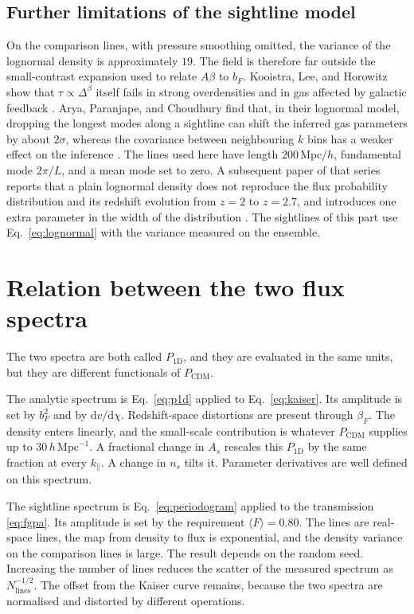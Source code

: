 \documentclass[11pt]{article}
\begin{document}
\subsection{Further limitations of the sightline model}

On the comparison lines, with pressure smoothing omitted, the variance of the lognormal density is approximately $19$.
The field is therefore far outside the small-contrast expansion used to relate $A\beta$ to $b_F$.
Kooistra, Lee, and Horowitz show that $\tau\propto\Delta^{\beta}$ itself fails in strong overdensities and in gas affected by galactic feedback \citep{Kooistra:2022hzw}.
Arya, Paranjape, and Choudhury find that, in their lognormal model, dropping the longest modes along a sightline can shift the inferred gas parameters by about $2\sigma$, whereas the covariance between neighbouring $k$ bins has a weaker effect on the inference \citep{Arya:2023ipe}.
The lines used here have length $200\,\mathrm{Mpc}/h$, fundamental mode $2\pi/L$, and a mean mode set to zero.
A subsequent paper of that series reports that a plain lognormal density does not reproduce the flux probability distribution and its redshift evolution from $z=2$ to $z=2.7$, and introduces one extra parameter in the width of the distribution \citep{Arya:2023fal}.
The sightlines of this part use Eq.~\eqref{eq:lognormal} with the variance measured on the ensemble.

\section{Relation between the two flux spectra}
\label{sec:relation}

The two spectra are both called $P_{1\mathrm{D}}$, and they are evaluated in the same units, but they are different functionals of $P_\mathrm{CDM}$.

The analytic spectrum is Eq.~\eqref{eq:p1d} applied to Eq.~\eqref{eq:kaiser}.
Its amplitude is set by $b_F^{2}$ and by $\mathrm{d}v/\mathrm{d}\chi$.
Redshift-space distortions are present through $\beta_F$.
The density enters linearly, and the small-scale contribution is whatever $P_\mathrm{CDM}$ supplies up to $30\,h\,\mathrm{Mpc}^{-1}$.
A fractional change in $A_s$ rescales this $P_{1\mathrm{D}}$ by the same fraction at every $k_\parallel$.
A change in $n_s$ tilts it.
Parameter derivatives are well defined on this spectrum.

The sightline spectrum is Eq.~\eqref{eq:periodogram} applied to the transmission \eqref{eq:fgpa}.
Its amplitude is set by the requirement $\langle F\rangle=0.80$.
The lines are real-space lines, the map from density to flux is exponential, and the density variance on the comparison lines is large.
The result depends on the random seed.
Increasing the number of lines reduces the scatter of the measured spectrum as $N_\mathrm{lines}^{-1/2}$.
The offset from the Kaiser curve remains, because the two spectra are normalised and distorted by different operations.
\end{document}
